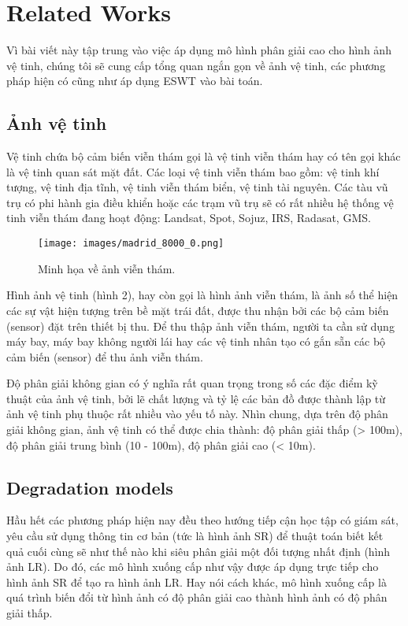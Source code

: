\documentclass[conference]{IEEEtran}
\begin{document}
\section{Related Works} \label{sect:related}
Vì bài viết này tập trung vào việc áp dụng mô hình phân giải cao cho hình ảnh vệ tinh, chúng tôi sẽ cung cấp tổng quan ngắn gọn về ảnh vệ tinh, các phương pháp hiện có cũng như áp dụng ESWT vào bài toán.

\subsection{Ảnh vệ tinh}
Vệ tinh chứa bộ cảm biến viễn thám gọi là vệ tinh viễn thám hay có tên gọi khác là vệ tinh quan sát mặt đất. Các loại vệ tinh viễn thám bao gồm: vệ tinh khí tượng, vệ tinh địa tĩnh, vệ tinh viễn thám biển, vệ tinh tài nguyên. Các tàu vũ trụ có phi hành gia điều khiển hoặc các trạm vũ trụ sẽ có rất nhiều hệ
thống vệ tinh viễn thám đang hoạt động: Landsat, Spot, Sojuz, IRS, Radasat, GMS.

\begin{figure} [!t]
    \centering
    \texttt{[image: images/madrid\_8000\_0.png]}
    \caption{Minh họa về ảnh viễn thám.}
    \label{fig:2.2}
\end{figure}

Hình ảnh vệ tinh (hình 2), hay còn gọi là hình ảnh viễn thám, là ảnh số thể hiện các sự vật hiện tượng trên bề mặt trái đất, được thu nhận bởi các bộ cảm biến (sensor) đặt trên thiết bị thu. Để thu thập ảnh viễn thám, người ta cần sử dụng máy bay, máy bay không người lái hay các vệ tinh nhân tạo có gắn sẵn các bộ cảm biến (sensor) để thu ảnh viễn thám.

Độ phân giải không gian có ý nghĩa rất quan trọng trong số các đặc điểm kỹ thuật của ảnh vệ tinh, bởi lẽ chất lượng và tỷ lệ các bản đồ được thành lập từ ảnh vệ tinh phụ thuộc rất nhiều vào yếu tố này. Nhìn chung, dựa trên độ phân giải không gian, ảnh vệ tinh có thể được chia thành: độ phân giải thấp (> 100m), độ phân giải trung bình (10 - 100m), độ phân giải cao (< 10m). 

\subsection{Degradation models}
Hầu hết các phương pháp hiện nay đều theo hướng tiếp cận học tập có giám sát, yêu cầu sử dụng thông tin cơ bản (tức là hình ảnh SR) để thuật toán biết kết quả cuối cùng sẽ như thế nào khi siêu phân giải một đối tượng nhất định (hình ảnh LR). Do đó, các mô hình xuống cấp như vậy được áp dụng trực tiếp cho hình ảnh SR để tạo ra hình ảnh LR. Hay nói cách khác, mô hình xuống cấp là quá trình biến đổi từ hình ảnh có độ phân
giải cao thành hình ảnh có độ phân giải thấp.
\end{document}
